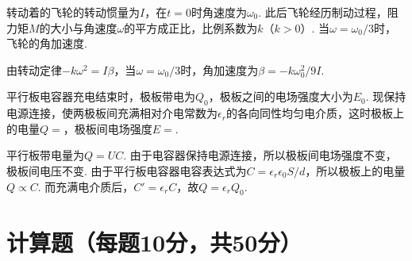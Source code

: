 \begin{problem}
    转动着的飞轮的转动惯量为$I$，在$t=0$时角速度为$\omega_0$. 此后飞轮经历制动过程，阻力矩$M$的大小与角速度$\omega$的平方成正比，比例系数为$k$（$k>0$）. 当$\omega=\omega_0/3$时，飞轮的角加速度.
\end{problem}
\begin{solution}
    由转动定律$-k\omega^2=I\beta$，当$\omega=\omega_0/3$时，角加速度为$\beta=-k\omega_0^2/9I$.
\end{solution}

\begin{problem}
    平行板电容器充电结束时，极板带电为$Q_0$，极板之间的电场强度大小为$E_0$. 现保持电源连接，使两极板间充满相对介电常数为$\epsilon_r$的各向同性均匀电介质，这时极板上的电量$Q=$，极板间电场强度$E=$.
\end{problem}
\begin{solution}
    平行板带电量为$Q=UC$. 由于电容器保持电源连接，所以极板间电场强度不变，极板间电压不变. 由于平行板电容器电容表达式为$C=\epsilon_r\epsilon_0S/d$，所以极板上的电量$Q\propto C$. 而充满电介质后，$C'=\epsilon_rC$，故$Q=\epsilon_rQ_0$.
\end{solution}

\clearpage
\section{计算题（每题10分，共50分）}

